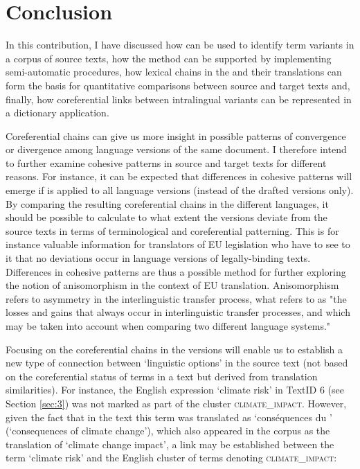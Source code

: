 \documentclass[output=paper]{langsci/langscibook.cls}
\begin{document}
\section{Conclusion}\label{sec:7}

In this contribution, I have discussed how  can be used to 
identify term variants in a corpus of source texts, how the method can be supported 
by implementing semi-automatic procedures, how lexical chains in the  
and their translations can form the basis for quantitative comparisons between 
source and target texts and, finally, how coreferential links between intralingual 
variants can be represented in a dictionary application.

Coreferential chains can give us more insight in possible patterns of convergence 
or divergence among language versions of the same document. I therefore intend 
to further examine cohesive patterns in source and target texts for different reasons. 
For instance, it can be expected that differences in cohesive patterns will emerge 
if  is applied to all language versions (instead of the drafted 
versions only). By comparing the resulting coreferential chains in the different 
languages, it should be possible to calculate to what extent the  
versions deviate from the source texts in terms of terminological  and 
coreferential patterning. This is for instance valuable information for translators 
of EU legislation who have to see to it that no deviations occur in language versions 
of legally-binding texts. Differences in cohesive patterns are thus a possible method for further exploring the notion of anisomorphism 
in the context of EU translation. Anisomorphism refers to asymmetry in the interlinguistic transfer process, what \citet[215]{GonzalezJoverGomez2006}refers to as "the losses and gains that always occur in interlinguistic transfer processes, and which may be taken into account when comparing two different language systems."

Focusing on the coreferential chains in the  versions will enable 
us to establish a new type of connection between `linguistic options' in the source 
text (not based on the coreferential status of terms in a text but derived from 
translation similarities). For instance, the English expression `climate risk' 
in TextID 6 (see Section \ref{sec:3}) was not marked as part of the cluster \textsc{climate\_impact}. 
However, given the fact that in the  text this term was translated as `conséquences 
du ' (`consequences of climate change'), which also appeared 
in the corpus as the translation of `climate change impact', a link may be established 
between the term `climate risk' and the English cluster of terms denoting \textsc{climate\_impact}:
\end{document}
